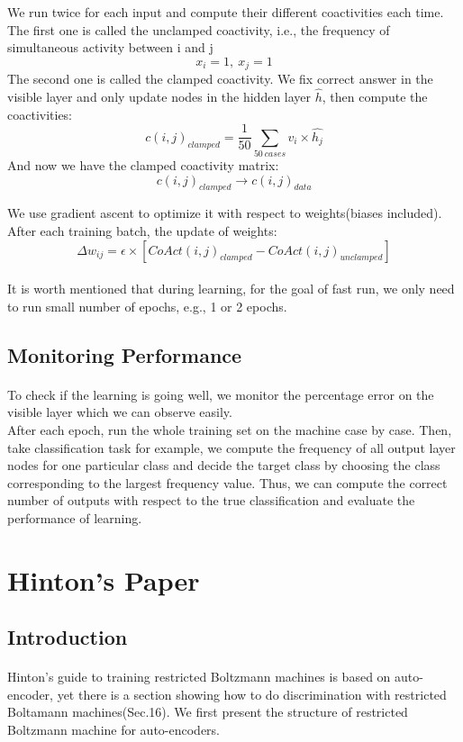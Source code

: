 \documentclass{article}
\begin{document}
We run twice for each input and compute their different coactivities each time. The first one is called the unclamped coactivity, i.e., the frequency of simultaneous activity between i and j \[x_{i}=1,\ x_{j}=1\]
The second one is called the clamped coactivity. We fix correct answer in the visible layer and only update nodes in the hidden layer $\hat{h}$, then compute the coactivities:
\[c(i,j)_{clamped}=\frac1{50}\sum_{50\ cases}v_i\times\hat{h_j}\]
And now we have the clamped coactivity matrix:
\[c(i,j)_{clamped}\to c(i,j)_{data}\]

We use gradient ascent to optimize it with respect to weights(biases included).\\
After each training batch, the update of weights:
\[\Delta w_{ij}=\epsilon \times[CoAct(i,j)_{clamped}-CoAct(i,j)_{unclamped}]\]

\paragraph{}
It is worth mentioned that during learning, for the goal of fast run, we only need to run small number of epochs, e.g., 1 or 2 epochs.

\subsection{Monitoring Performance}
\paragraph{}
To check if the learning is going well, we monitor the percentage error on the visible layer which we can observe easily.\\
After each epoch, run the whole training set on the machine case by case. Then, take classification task for example, we compute the frequency of all output layer nodes for one particular class and decide the target class by choosing the class corresponding to the largest frequency value. Thus, we can compute the correct number of outputs with respect to the true classification and evaluate the performance of learning.
\clearpage
\section{Hinton's Paper}
\subsection{Introduction}
\paragraph{}
Hinton's guide to training restricted Boltzmann machines is based on auto-encoder, yet there is a section showing how to do discrimination with restricted Boltamann machines(Sec.16). We first present the structure of restricted Boltzmann machine for auto-encoders.
\end{document}
